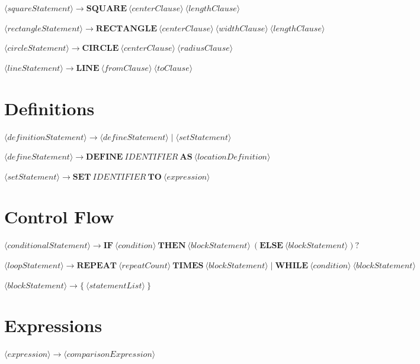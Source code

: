 \(
\langle squareStatement \rangle \rightarrow \textbf{SQUARE} \ \langle centerClause \rangle \ \langle lengthClause \rangle
\)

\(
\langle rectangleStatement \rangle \rightarrow \textbf{RECTANGLE} \ \langle centerClause \rangle \ \langle widthClause \rangle \ \langle lengthClause \rangle
\)

\(
\langle circleStatement \rangle \rightarrow \textbf{CIRCLE} \ \langle centerClause \rangle \ \langle radiusClause \rangle
\)

\(
\langle lineStatement \rangle \rightarrow \textbf{LINE} \ \langle fromClause \rangle \ \langle toClause \rangle
\)

\section{Definitions}

\(
\langle definitionStatement \rangle \rightarrow
\langle defineStatement \rangle
\mid \langle setStatement \rangle
\)

\(
\langle defineStatement \rangle \rightarrow \textbf{DEFINE} \ IDENTIFIER \ \textbf{AS} \ \langle locationDefinition \rangle
\)

\(
\langle setStatement \rangle \rightarrow \textbf{SET} \ IDENTIFIER \ \textbf{TO} \ \langle expression \rangle
\)

\section{Control Flow}

\(
\langle conditionalStatement \rangle \rightarrow
\textbf{IF} \ \langle condition \rangle \ \textbf{THEN} \ \langle blockStatement \rangle \ (\textbf{ELSE} \ \langle blockStatement \rangle)?
\)

\(
\langle loopStatement \rangle \rightarrow
\textbf{REPEAT} \ \langle repeatCount \rangle \ \textbf{TIMES} \ \langle blockStatement \rangle
\mid \textbf{WHILE} \ \langle condition \rangle \ \langle blockStatement \rangle
\)

\(
\langle blockStatement \rangle \rightarrow \{ \ \langle statementList \rangle \ \}
\)

\section{Expressions}

\(
\langle expression \rangle \rightarrow \langle comparisonExpression \rangle
\)

